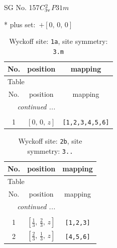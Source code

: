 \documentclass[fleqn,8pt]{jsarticle}
\begin{document}
\setcounter{MaxMatrixCols}{32}

\renewcommand{\tablename}{Table~}
\renewcommand{\figurename}{Figure~}
\begin{center}
\LARGE
SG No. 157\quad$C_{\rm 3v}^{2}$\quad$P31m$\quad[ trigonal ]
\end{center}
* plus set:\,\,\,$+\left[ 0,\, 0,\, 0 \right]$
\renewcommand{\arraystretch}{1.2}
\begin{longtable}{ccc}
\caption{Wyckoff site: {\tt 1a}, site symmetry: {\tt 3.m}}
 \\
 \hline \hline
No. & position & mapping \\ \hline \endfirsthead

\multicolumn{2}{l}{\tablename\ \thetable{}} \\
 \hline \hline
No. & position & mapping \\ \hline \endhead

 \hline \hline
\multicolumn{2}{r}{\footnotesize\it continued ...} \\ \endfoot

 \hline \hline
\multicolumn{2}{r}{} \\ \endlastfoot

1 & $\left[ 0,\, 0,\, z \right]$ & {\tt [1,2,3,4,5,6]} \\
\end{longtable}
\renewcommand{\arraystretch}{1.2}
\begin{longtable}{ccc}
\caption{Wyckoff site: {\tt 2b}, site symmetry: {\tt 3..}}
 \\
 \hline \hline
No. & position & mapping \\ \hline \endfirsthead

\multicolumn{2}{l}{\tablename\ \thetable{}} \\
 \hline \hline
No. & position & mapping \\ \hline \endhead

 \hline \hline
\multicolumn{2}{r}{\footnotesize\it continued ...} \\ \endfoot

 \hline \hline
\multicolumn{2}{r}{} \\ \endlastfoot

1 & $\left[ \frac{1}{3},\, \frac{2}{3},\, z \right]$ & {\tt [1,2,3]} \\ \hline
2 & $\left[ \frac{2}{3},\, \frac{1}{3},\, z \right]$ & {\tt [4,5,6]} \\
\end{longtable}
\renewcommand{\arraystretch}{1.2}
\end{document}
